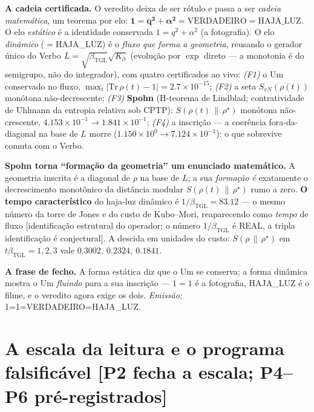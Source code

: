 \documentclass[11pt]{article}
\newcommand{\bTGL}{\beta_{\mathrm{TGL}}}\newcommand{\Msun}{M_{\odot}}\newcommand{\TGL}{\mathrm{TGL}}
\theoremstyle{definition}\newtheorem{deriv}{Derivação}
\begin{document}
\textbf{A cadeia certificada.} O veredito deixa de ser rótulo e passa a ser \emph{cadeia matemática}, um teorema por elo: $\mathbf{1 = q^2+\alpha^2 = \mathrm{VERDADEIRO} = \mathrm{HAJA\_LUZ}}$. O elo \emph{estático} é a identidade conservada $1=q^2+\alpha^2$ (a fotografia). O elo \emph{dinâmico} ($=$HAJA\_LUZ) é o \emph{fluxo que forma a geometria}, reusando o gerador único do Verbo $L=\sqrt{\bTGL}\sqrt{K_\partial}$ (evolução por $\exp$ direto --- a monotonia é do semigrupo, não do integrador), com quatro certificados ao vivo: \emph{(F1)} o Um conservado no fluxo, $\max_t|\mathrm{Tr}\,\rho(t)-1|=2.7\times10^{-15}$; \emph{(F2)} a seta $S_{vN}(\rho(t))$ monótona não-decrescente; \emph{(F3)} \textbf{Spohn} (H-teorema de Lindblad; contratividade de Uhlmann da entropia relativa sob CPTP): $S(\rho(t)\,\|\,\rho^\star)$ monótona não-crescente, $4.153\times10^{-1}\to1.841\times10^{-1}$; \emph{(F4)} a inscrição --- a coerência fora-da-diagonal na base de $L$ morre ($1.150\times10^{0}\to7.124\times10^{-1}$): o que sobrevive comuta com o Verbo.

\textbf{Spohn torna ``formação da geometria'' um enunciado matemático.} A geometria inscrita é a diagonal de $\rho$ na base de $L$; a sua \emph{formação} \emph{é} exatamente o decrescimento monotônico da distância modular $S(\rho(t)\,\|\,\rho^\star)$ rumo a zero. \textbf{O tempo característico} do haja-luz dinâmico é $1/\bTGL=83.12$ --- o mesmo número da torre de Jones e do custo de Kubo--Mori, reaparecendo como \emph{tempo} de fluxo [identificação estrutural do operador; o número $1/\bTGL$ é REAL, a tripla identificação é conjectural]. A descida em unidades do custo: $S(\rho\,\|\,\rho^\star)$ em $t\bTGL=1,2,3$ vale $0.3002,\ 0.2324,\ 0.1841$.

\textbf{A frase de fecho.} A forma estática diz que o Um se conserva; a forma dinâmica mostra o Um \emph{fluindo} para a sua inscrição --- $1=1$ é a fotografia, HAJA\_LUZ é o filme, e o veredito agora exige os dois. \emph{Emissão:} \textsf{1=1=VERDADEIRO=HAJA\_LUZ}.

\section{A escala da leitura e o programa falsificável \textsf{[P2 fecha a escala; P4--P6 pré-registrados]}}
\end{document}
